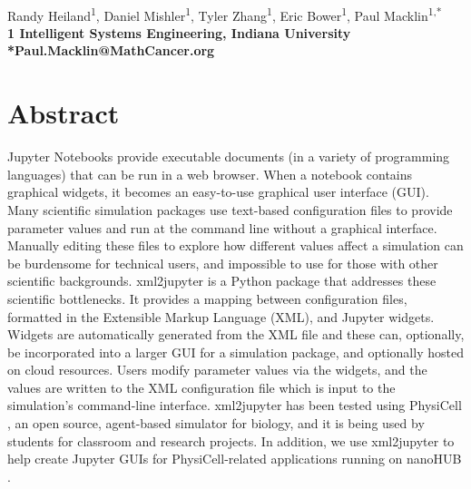 \documentclass[10pt,letterpaper]{article}
\begin{document}
\vspace*{0.35in}

\begin{flushleft}
{\Large
\textbf{}
}
\newline
\\
Randy Heiland\textsuperscript{1},
Daniel Mishler\textsuperscript{1},
Tyler Zhang\textsuperscript{1},
Eric Bower\textsuperscript{1},
Paul Macklin\textsuperscript{1,*}
\\
\bigskip
\bf{1} Intelligent Systems Engineering, Indiana University
\bigskip
\\
*Paul.Macklin@MathCancer.org 

\end{flushleft}

\section*{Abstract}
Jupyter Notebooks \cite{Kluyver:2016aa,Nature_2018_Jupyter} provide
executable documents (in a variety of programming languages) that can be
run in a web browser. When a notebook contains graphical widgets, it
becomes an easy-to-use graphical user interface (GUI). Many scientific
simulation packages use text-based configuration files to provide
parameter values and run at the command line without a graphical
interface. Manually editing these files to explore how different values
affect a simulation can be burdensome for technical users, and
impossible to use for those with other scientific backgrounds.
xml2jupyter is a Python package that addresses these scientific
bottlenecks. It provides a mapping between configuration files,
formatted in the Extensible Markup Language (XML), and Jupyter widgets.
Widgets are automatically generated from the XML file and these can,
optionally, be incorporated into a larger GUI for a simulation package,
and optionally hosted on cloud resources. Users modify parameter values
via the widgets,
and the values are written to the XML configuration file which is input
to the simulation's command-line interface. xml2jupyter has been tested
using PhysiCell \cite{PhysiCell:2018}, an open source, agent-based
simulator for biology, and it is being used by students for classroom
and research projects. In addition, we use xml2jupyter to help create
Jupyter GUIs for PhysiCell-related applications running on nanoHUB \cite{nanoHUB_2013}.
\end{document}
